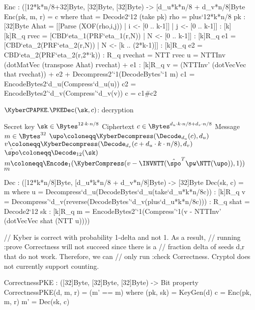 \begin{code}
  Enc : ([12*k*n/8+32]Byte, [32]Byte, [32]Byte) -> [d_u*k*n/8 + d_v*n/8]Byte
  Enc(pk, m, r) = c where
    that = Decode2`{12} (take pk)
    rho = plus`{12*k*n/8} pk : [32]Byte
    Ahat = [[Parse (XOF(rho,i,j)) | i <- [0 .. k-1]] | j <- [0 .. k-1]] : [k][k]R_q
    rvec = [CBD`{eta_1}(PRF`{eta_1}(r,N)) | N <- [0 .. k-1]] : [k]R_q
    e1 = [CBD`{eta_2}(PRF`{eta_2}(r,N)) | N <- [k .. (2*k-1)]] : [k]R_q
    e2 = CBD`{eta_2}(PRF`{eta_2}(r,2*`k)) : R_q
    rvechat = NTT rvec
    u = NTTInv (dotMatVec (transpose Ahat) rvechat) + e1 : [k]R_q
    v = (NTTInv' (dotVecVec that rvechat)) + e2 + Decompress2'`{1}(DecodeBytes'`{1} m)
    c1 = EncodeBytes2`{d_u}(Compress`{d_u}(u))
    c2 = EncodeBytes2'`{d_v}(Compress'`{d_v}(v))
    c = c1#c2
\end{code}

\begin{algorithm}
  \caption{$\KyberCPAPKE.\PKEDec(\sk,c)$: decryption\label{kybercpa-dec}}
  \begin{algorithmic}[1]
    \Require Secret key $\sk \in \Bytes^{12\cdot k\cdot n/8}$
    \Require Ciphertext $c \in \Bytes^{d_u\cdot k\cdot n/8 + d_v\cdot n/8}$
    \Ensure Message $m \in \Bytes^{32}$
    \State $\upo \coloneqq \KyberDecompress(\Decode_{d_u}(c),d_u)$
    \State $v \coloneqq \KyberDecompress(\Decode_{d_v}(c+d_u\cdot k\cdot n/8),d_v)$
    \State $\hat{\spo} \coloneqq \Decode_{12}(\sk)$
    \State $m \coloneqq \Encode_1(\KyberCompress(v-\INVNTT(\hat{\spo}^T\pw\NTT(\upo)),1))$ \label{line:decrypt} 
    \State \Return $m$
\end{algorithmic}
\end{algorithm}

\begin{code}
  Dec : ([12*k*n/8]Byte, [d_u*k*n/8 + d_v*n/8]Byte) -> [32]Byte
  Dec(sk, c) = m where
    u = Decompress`{d_u}(DecodeBytes`{d_u}(take`{d_u*k*n/8}c))   : [k]R_q
    v = Decompress'`{d_v}(reverse(DecodeBytes'`{d_v}(plus`{d_u*k*n/8}c))) : R_q
    shat = Decode2`{12} sk : [k]R_q
    m = EncodeBytes2'`{1}(Compress'`{1}(v - NTTInv' (dotVecVec shat (NTT u))))

  // Kyber is correct with probability 1-delta and not 1. As a result,
  // running :prove Correctness will not succeed since there is a 
  // fraction delta of seeds d,r that do not work. Therefore, we can 
  // only run :check Correctness. Cryptol does not currently support counting.

  CorrectnessPKE : ([32]Byte, [32]Byte, [32]Byte) -> Bit
  property CorrectnessPKE(d, m, r) = (m' == m) where
    (pk, sk) = KeyGen(d)
    c = Enc(pk, m, r)
    m' = Dec(sk, c)
\end{code}

